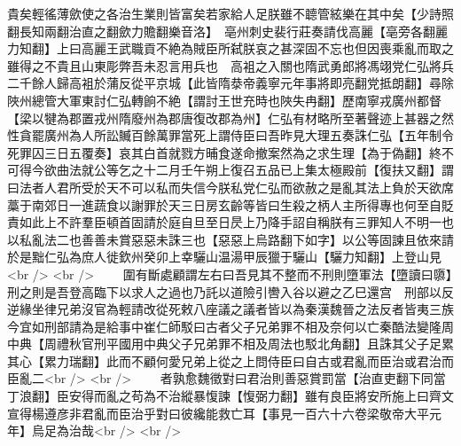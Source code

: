 貴矣輕徭薄歛使之各治生業則皆富矣若家給人足朕雖不聼管絃樂在其中矣【少詩照翻長知兩翻治直之翻歛力贍翻樂音洛】　亳州刺史裴行莊奏請伐高麗【亳旁各翻麗力知翻】上曰高麗王武職貢不絶為賊臣所弑朕哀之甚深固不忘也但因喪乘亂而取之雖得之不貴且山東彫弊吾未忍言用兵也　高袓之入關也隋武勇郎將馮翊党仁弘將兵二千餘人歸高袓於蒲反從平京城【此皆隋㳟帝義寧元年事將即亮翻党抵朗翻】尋除陜州總管大軍東討仁弘轉餉不絶【謂討王世充時也陜失冉翻】歷南寧戎廣州都督【梁以犍為郡置戎州隋廢州為郡唐復改郡為州】仁弘有材略所至著聲迹上甚器之然性貪罷廣州為人所訟贓百餘萬罪當死上謂侍臣曰吾昨見大理五奏誅仁弘【五年制令死罪囚三日五覆奏】哀其白首就戮方晡食遂命撤案然為之求生理【為于偽翻】終不可得今欲曲法就公等乞之十二月壬午朔上復召五品已上集太極殿前【復扶又翻】謂曰法者人君所受於天不可以私而失信今朕私党仁弘而欲赦之是亂其法上負於天欲席藁于南郊日一進蔬食以謝罪於天三日房玄齡等皆曰生殺之柄人主所得專也何至自貶責如此上不許羣臣頓首固請於庭自旦至日昃上乃降手詔自稱朕有三罪知人不明一也以私亂法二也善善未賞惡惡未誅三也【惡惡上烏路翻下如字】以公等固諫且依來請於是黜仁弘為庶人徙欽州癸卯上幸驪山温湯甲辰獵于驪山【驪力知翻】上登山見<br />
<br />
　　圍有斷處顧謂左右曰吾見其不整而不刑則墮軍法【墮讀曰隳】刑之則是吾登高臨下以求人之過也乃託以道險引轡入谷以避之乙巳還宫　刑部以反逆緣坐律兄弟沒官為輕請改從死敕八座議之議者皆以為秦漢魏晉之法反者皆夷三族今宜如刑部請為是給事中崔仁師駁曰古者父子兄弟罪不相及奈何以亡秦酷法變隆周中典【周禮秋官刑平國用中典父子兄弟罪不相及周法也駁北角翻】且誅其父子足累其心【累力瑞翻】此而不顧何愛兄弟上從之上問侍臣曰自古或君亂而臣治或君治而臣亂二<br />
<br />
　　者孰愈魏徵對曰君治則善惡賞罰當【治直吏翻下同當丁浪翻】臣安得而亂之苟為不治縱暴愎諫【愎弼力翻】雖有良臣將安所施上曰齊文宣得楊遵彦非君亂而臣治乎對曰彼纔能救亡耳【事見一百六十六卷梁敬帝大平元年】烏足為治哉<br />
<br />
